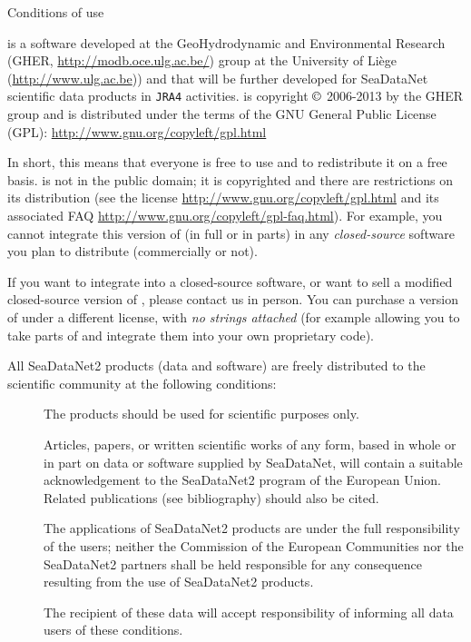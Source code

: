 
\vspace*{\fill}

\begin{center}
\begin{minipage}[c]{.85\textwidth}

\Large{Conditions of use}
\vspace{1cm}
\normalsize


\vspace{.25cm}
\diva is a software developed at the GeoHydrodynamic and Environmental Research (GHER, \url{http://modb.oce.ulg.ac.be/}) group at the University of Liège (\url{http://www.ulg.ac.be})) and that will be further developed for SeaDataNet scientific data products in \texttt{JRA4} activities. \diva is copyright $\copyright$  2006-2013 by the GHER group and is distributed under the terms of the GNU General Public License (GPL): \url{http://www.gnu.org/copyleft/gpl.html} 

In short, this means that everyone is free to use \diva and to redistribute it on a free basis. \diva is not in the public domain; it is copyrighted and there are restrictions on its distribution (see the license \url{http://www.gnu.org/copyleft/gpl.html} and its associated FAQ \url{http://www.gnu.org/copyleft/gpl-faq.html}). For example, you cannot integrate this version of \diva (in full or in parts) in any \textit{closed-source} software you plan to distribute (commercially or not).

If you want to integrate \diva into a closed-source software, or want to sell a modified closed-source version of \diva, please contact us in person. You can purchase a version of \diva under a different license, with \textit{no strings attached} (for example allowing you to take parts of \diva and integrate them into your own proprietary code).

\vspace{.25cm}
All SeaDataNet2 products (data and software) are freely distributed to the scientific community at the following conditions: 

\begin{description}
\item[\checkmark] The products should be used for scientific purposes only.
\item[\checkmark] Articles, papers, or written scientific works of any form, based in whole or in part on data or software supplied by SeaDataNet, will contain a suitable acknowledgement to the SeaDataNet2 program of the European Union. Related publications (see bibliography) should also be cited.
\item[\checkmark] The applications of SeaDataNet2 products are under the full responsibility of the users; neither the Commission of the European Communities nor the SeaDataNet2 partners shall be held responsible for any consequence resulting from the use of SeaDataNet2 products. 
\item[\checkmark] The recipient of these data will accept responsibility of informing all data users of these conditions.
\end{description}


\end{minipage}
\end{center}
